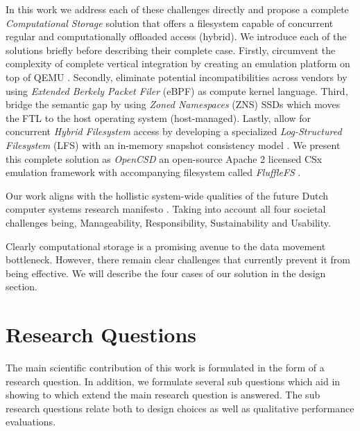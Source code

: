 
In this work we address each of these challenges directly and propose a
complete \textit{Computational Storage} solution that offers a filesystem
capable of concurrent regular and computationally offloaded access (hybrid).
We introduce each of the solutions briefly before describing their complete
case. Firstly, circumvent the complexity of complete vertical integration by
creating an emulation platform on top of QEMU \cite{qemu}. Secondly, eliminate
potential incompatibilities across vendors by using \textit{Extended Berkely
Packet Filer} (eBPF) \cite{what-ebpf} as compute kernel language. Third, bridge
the semantic gap by using \textit{Zoned Namespaces} (ZNS) \cite{zns} SSDs which
moves the FTL to the host operating system (host-managed). Lastly, allow for
concurrent \textit{Hybrid Filesystem} access by developing a specialized
\textit{Log-Structured Filesystem} (LFS) \cite{Rosenblum1992TheDA} with an
in-memory snapshot consistency model \cite{Viotti2016ConsistencyIN}. We present
this complete solution as \textit{OpenCSD} an open-source Apache 2 licensed CSx
emulation framework with accompanying filesystem called \textit{FluffleFS}
\cite{qemu-csd}.

Our work aligns with the hollistic system-wide qualities of the future Dutch
computer systems research manifesto
\cite{Iosup2018MassivizingCS, Iosup2022FutureCS}. Taking into account all four
societal challenges being, Manageability, Responsibility, Sustainability and
Usability.

Clearly computational storage is a promising avenue to the data movement
bottleneck. However, there remain clear challenges that currently prevent it
from being effective. We will describe the four cases of our solution in the
design section.



\section{Research Questions}

The main scientific contribution of this work is formulated in the form of a
research question. In addition, we formulate several sub questions which aid in
showing to which extend the main research question is answered. The sub research
questions relate both to design choices as well as qualitative performance
evaluations.

